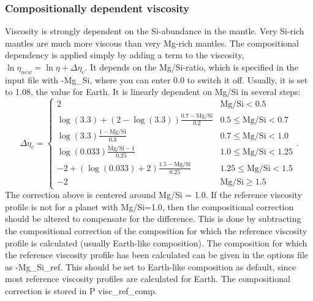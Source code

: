 \subsubsection{Compositionally dependent viscosity}
Viscosity is strongly dependent on the Si-abundance in the mantle. Very Si-rich mantles are much more viscous than very Mg-rich mantles. The compositional dependency is applied simply by adding a term to the viscosity, $\ln \eta_{new} = \ln \eta + \Delta \eta_c$. It depends on the Mg/Si-ratio, which is specified in the input file with -Mg\_Si, where you can enter 0.0 to switch it off. Usually, it is set to 1.08, the value for Earth. It is linearly dependent on Mg/Si in several steps:
\begin{equation}
\Delta \eta_c = 
\begin{cases}
2 & \text{Mg/Si} < 0.5 \\
\log(3.3) + (2 - \log(3.3))\frac{0.7 - \text{Mg/Si}}{0.2} & 0.5 \leq \text{Mg/Si} < 0.7 \\
\log(3.3)\frac{1 - \text{Mg/Si}}{0.3} & 0.7 \leq \text{Mg/Si} < 1.0 \\
\log(0.033)\frac{\text{Mg/Si}-1}{0.25} & 1.0 \leq \text{Mg/Si} < 1.25 \\
-2 + (\log(0.033) + 2)\frac{1.5 - \text{Mg/Si}}{0.25} & 1.25 \leq \text{Mg/Si} < 1.5 \\
-2 & \text{Mg/Si} \geq 1.5
\end{cases}.
\end{equation}
The correction above is centered around Mg/Si = 1.0. If the reference viscosity profile is not for a planet with Mg/Si=1.0, then the compositional correction should be altered to compensate for the difference. This is done by subtracting the compositional correction of the composition for which the reference viscosity profile is calculated (usually Earth-like composition). The composition for which the reference viscosity profile has been calculated can be given in the options file as -Mg\_Si\_ref. This should be set to Earth-like composition as default, since most reference viscosity profiles are calculated for Earth. The compositional correction is stored in P visc\_ref\_comp.

